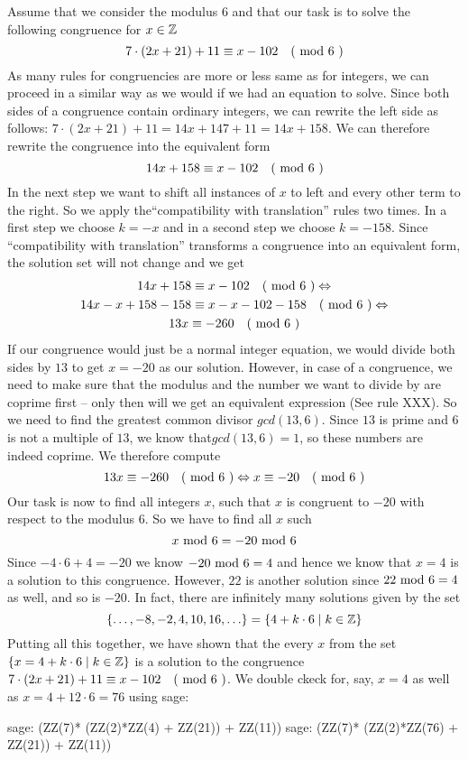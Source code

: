\begin{example}
\label{example_first_congruence}
Assume that we consider the modulus $6$ and that our task is to solve the following congruence for $x\in \mathbb{Z}$
$$7\cdot(2x+21) + 11 \equiv x-102 \quad \text{( mod } 6 \text{ )}$$
As many rules for congruencies are more or less same as for integers, we can proceed in a  similar way as we would if we had an equation to solve. 
Since both sides of a congruence contain ordinary integers, we can rewrite the left side as follows: $7\cdot(2x+21) + 11 = 14x + 147 + 11 = 14x +158$. We can therefore rewrite the congruence into the equivalent form
$$14x +158 \equiv x-102 \quad \text{( mod } 6 \text{ )}$$
In the next step we want to shift all instances of $x$ to left and every other term to the right. So we apply the``compatibility with translation'' rules two times. In a first step we choose $k=-x$ and in a second step we choose $k=-158$. Since ``compatibility with translation'' transforms a congruence into an equivalent form, the solution set will not change and we get 
\begin{multline*}
14x +158 \equiv x-102 \quad \text{( mod } 6 \text{ )} \Leftrightarrow\\
14x-x +158-158 \equiv x-x-102-158 \quad \text{( mod } 6 \text{ )} \Leftrightarrow \\
13x \equiv -260 \quad \text{( mod } 6 \text{ )}
\end{multline*}
If our congruence would just be a normal integer equation, we would divide both sides by $13$ to get $x=-20$ as our solution. However, in case of a congruence, we need to make sure that the modulus and the number we want to divide by are coprime first – only then will we get an equivalent expression (See rule XXX). So we need to find the greatest common divisor $gcd(13,6)$. Since $13$ is prime and $6$ is not a multiple of $13$, we know that$gcd(13,6)=1$, so these numbers are indeed coprime. We therefore compute 
$$
13x \equiv -260 \quad \text{( mod } 6 \text{ )} \Leftrightarrow x \equiv -20 \quad \text{( mod } 6 \text{ )}
$$
Our task is now to find all integers $x$, such that $x$ is congruent to $-20$ with respect to the modulus $6$. So we have to find all $x$ such
$$
x \text{ mod } 6 = -20 \text{ mod } 6
$$
Since $-4\cdot 6 +4 = -20$ we know $ -20 \text{ mod } 6 = 4$ and hence we know that $x=4$ is a solution to this congruence. However, $22$ is another solution since $ 22 \text{ mod } 6 = 4$ as well, and so is $-20$. In fact, there are infinitely many solutions given by the set
$$
\{\ldots, -8,-2, 4,10, 16,\ldots\} = \{4+k\cdot 6 \;|\; k\in \mathbb{Z}\}
$$
Putting all this together, we have shown that the every $x$ from the set $\{x=4+k\cdot 6 \;|\; k\in \mathbb{Z}\}$ is a solution to the congruence $7\cdot(2x+21) + 11 \equiv x-102 \quad \text{( mod } 6 \text{ )}$. We double ckeck for, say, $x=4$ as well as $x=4 + 12\cdot 6 = 76$ using sage:
\begin{sagecommandline}
sage: (ZZ(7)* (ZZ(2)*ZZ(4) + ZZ(21)) + ZZ(11))  %
sage: (ZZ(7)* (ZZ(2)*ZZ(76) + ZZ(21)) + ZZ(11))  %
\end{sagecommandline}
\end{example}
